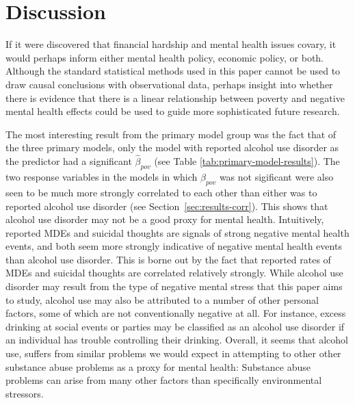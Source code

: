 \documentclass{article}
\begin{document}
\section{Discussion}


If it were discovered that financial hardship and mental
health issues covary, it would perhaps inform
either mental health policy, economic policy, or both.
Although the standard statistical methods used in this paper
cannot be used to draw causal conclusions with observational data,
perhaps insight into whether there is evidence that there
is a linear relationship between poverty and negative mental health effects
could be used to guide more sophisticated future research.

The most interesting result from the primary model group
was the fact that of the three primary models,
only the model with reported alcohol use disorder
as the predictor had a significant $\hat{\beta}_{pov}$
(see Table \ref{tab:primary-model-results}).
The two response variables in the models in which
$\hat{\beta}_{pov}$ was not sigificant were also
seen to be much more strongly correlated to each other
than either was to reported alcohol use disorder
(see Section~\ref{sec:results-corr}).
This shows that alcohol use disorder may not
be a good proxy for mental health.
Intuitively, reported MDEs and suicidal thoughts
are signals of strong negative mental health events,
and both seem more strongly indicative of negative mental health events
than alcohol use disorder.
This is borne out by the fact that
reported rates of MDEs and suicidal thoughts
are correlated relatively strongly.
While alcohol use disorder may result from the type of negative
mental stress that this paper aims to study,
alcohol use may also be attributed to a number
of other personal factors, some of which are not conventionally
negative at all.
For instance, excess drinking at social events or parties
may be classified as an alcohol use disorder if
an individual has trouble controlling their drinking.
Overall, it seems that alcohol use,
suffers from similar problems we would expect in attempting
to other other substance abuse problems
as a proxy for mental health:
Substance abuse problems can arise from many other
factors than specifically environmental stressors.
\end{document}
